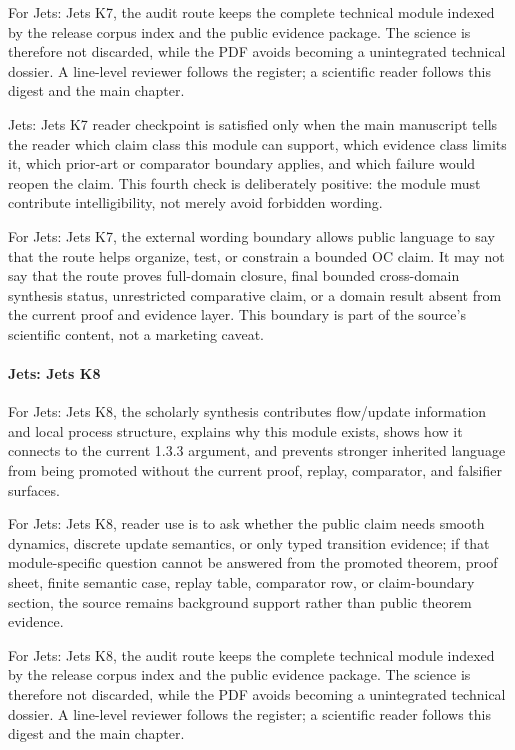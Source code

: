 For Jets: Jets K7, the audit route keeps the complete technical module indexed by the release corpus index and the public evidence package. The science is therefore not discarded, while the PDF avoids becoming a unintegrated technical dossier. A line-level reviewer follows the register; a scientific reader follows this digest and the main chapter.


Jets: Jets K7 reader checkpoint is satisfied only when the main manuscript tells the reader which claim class this module can support, which evidence class limits it, which prior-art or comparator boundary applies, and which failure would reopen the claim. This fourth check is deliberately positive: the module must contribute intelligibility, not merely avoid forbidden wording.


For Jets: Jets K7, the external wording boundary allows public language to say that the route helps organize, test, or constrain a bounded OC claim. It may not say that the route proves full-domain closure, final bounded cross-domain synthesis status, unrestricted comparative claim, or a domain result absent from the current proof and evidence layer. This boundary is part of the source's scientific content, not a marketing caveat.


\paragraph{Jets: Jets K8}

For Jets: Jets K8, the scholarly synthesis contributes flow/update information and local process structure, explains why this module exists, shows how it connects to the current 1.3.3 argument, and prevents stronger inherited language from being promoted without the current proof, replay, comparator, and falsifier surfaces.


For Jets: Jets K8, reader use is to ask whether the public claim needs smooth dynamics, discrete update semantics, or only typed transition evidence; if that module-specific question cannot be answered from the promoted theorem, proof sheet, finite semantic case, replay table, comparator row, or claim-boundary section, the source remains background support rather than public theorem evidence.


For Jets: Jets K8, the audit route keeps the complete technical module indexed by the release corpus index and the public evidence package. The science is therefore not discarded, while the PDF avoids becoming a unintegrated technical dossier. A line-level reviewer follows the register; a scientific reader follows this digest and the main chapter.


